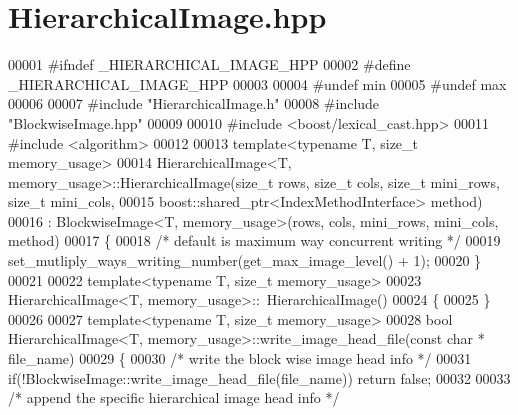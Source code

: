 \section{Hierarchical\-Image.\-hpp}
\label{_hierarchical_image_8hpp}

\begin{DoxyCode}
00001 \textcolor{preprocessor}{#ifndef \_HIERARCHICAL\_IMAGE\_HPP}
00002 \textcolor{preprocessor}{}\textcolor{preprocessor}{#define \_HIERARCHICAL\_IMAGE\_HPP}
00003 \textcolor{preprocessor}{}
00004 \textcolor{preprocessor}{#undef min}
00005 \textcolor{preprocessor}{}\textcolor{preprocessor}{#undef max}
00006 \textcolor{preprocessor}{}
00007 \textcolor{preprocessor}{#include "HierarchicalImage.h"}
00008 \textcolor{preprocessor}{#include "BlockwiseImage.hpp"}
00009 
00010 \textcolor{preprocessor}{#include <boost/lexical\_cast.hpp>}
00011 \textcolor{preprocessor}{#include <algorithm>}
00012 
00013 \textcolor{keyword}{template}<\textcolor{keyword}{typename} T, \textcolor{keywordtype}{size\_t} memory\_usage>
00014 HierarchicalImage<T, memory_usage>::HierarchicalImage(\textcolor{keywordtype}{size\_t} rows, \textcolor{keywordtype}{size\_t} cols,
       \textcolor{keywordtype}{size\_t} mini\_rows, \textcolor{keywordtype}{size\_t} mini\_cols,
00015         boost::shared\_ptr<IndexMethodInterface> method)
00016         : BlockwiseImage<T, memory\_usage>(rows, cols, mini\_rows, mini\_cols, 
      method)
00017 \{
00018         \textcolor{comment}{/* default is maximum way concurrent writing */}
00019         set_mutliply_ways_writing_number(get_max_image_level() + 1);
00020 \}
00021 
00022 \textcolor{keyword}{template}<\textcolor{keyword}{typename} T, \textcolor{keywordtype}{size\_t} memory\_usage>
00023 HierarchicalImage<T, memory_usage>::~HierarchicalImage()
00024 \{
00025 \}
00026 
00027 \textcolor{keyword}{template}<\textcolor{keyword}{typename} T, \textcolor{keywordtype}{size\_t} memory\_usage>
00028 \textcolor{keywordtype}{bool} HierarchicalImage<T, memory_usage>::write_image_head_file(\textcolor{keyword}{const} \textcolor{keywordtype}{char} *
      file\_name)
00029 \{
00030         \textcolor{comment}{/* write the block wise image head info */}
00031         \textcolor{keywordflow}{if}(!BlockwiseImage::write_image_head_file(file\_name))   \textcolor{keywordflow}{return} \textcolor{keyword}{false};
00032 
00033         \textcolor{comment}{/* append the specific hierarchical image head info */}

\end{DoxyCode}

